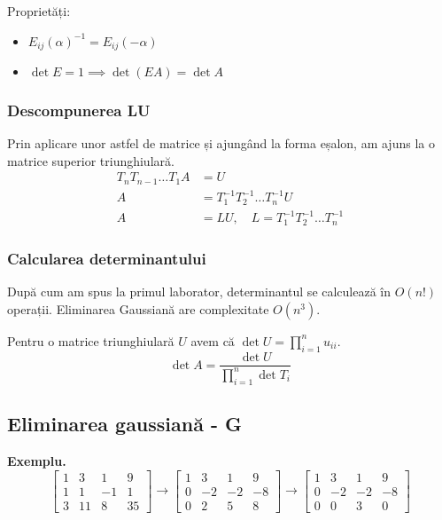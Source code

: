 \documentclass{exam}
\begin{document}
Proprietăți:
\begin{itemize}
	\item $E_{ij}(\alpha)^{-1} = E_{ij}(-\alpha)$
	\item $\det E = 1 \implies \det (EA) = \det A$
\end{itemize}

\subsubsection{Descompunerea LU}

Prin aplicare unor astfel de matrice și ajungând la forma eșalon, am ajuns
la o matrice superior triunghiulară.
\begin{align*}
	T_nT_{n-1}\ldots T_1 A & = U                                             \\
	A                      & = T_1^{-1}T_2^{-1}\ldots T_n^{-1}U              \\
	A                      & = LU, \quad L = T_1^{-1}T_2^{-1}\ldots T_n^{-1}
\end{align*}

\subsubsection{Calcularea determinantului}

După cum am spus la primul laborator, determinantul se calculează în $O(n!)$
operații. Eliminarea Gaussiană are complexitate $O(n^3)$.

Pentru o matrice triunghiulară $U$ avem că $\det U = \prod_{i=1}^{n} u_{ii}$.
\begin{equation*}
	\det A = \frac{\det U}{\prod_{i = 1}^{n} \det T_i}
\end{equation*}

\subsection{Eliminarea gaussiană - G}

\textbf{Exemplu.}
\begin{equation*}
	\begin{bmatrix}
		1 & 3  & 1  & 9  \\
		1 & 1  & -1 & 1  \\
		3 & 11 & 8  & 35
	\end{bmatrix} \to
	\begin{bmatrix}
		1 & 3  & 1  & 9  \\
		0 & -2 & -2 & -8 \\
		0 & 2  & 5  & 8
	\end{bmatrix} \to
	\begin{bmatrix}
		1 & 3  & 1  & 9  \\
		0 & -2 & -2 & -8 \\
		0 & 0  & 3  & 0
	\end{bmatrix}
\end{equation*}
\end{document}
